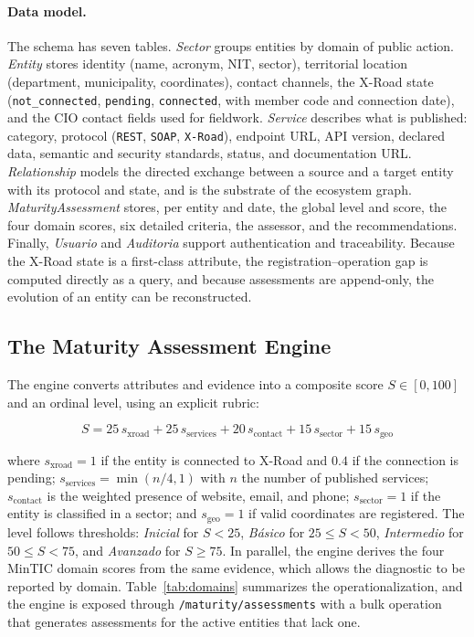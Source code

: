 \documentclass[runningheads]{llncs}
\begin{document}
\paragraph{Data model.} The schema has seven tables. \emph{Sector} groups
entities by domain of public action. \emph{Entity} stores identity (name,
acronym, NIT, sector), territorial location (department, municipality,
coordinates), contact channels, the X-Road state
(\texttt{not\_connected}, \texttt{pending}, \texttt{connected}, with member
code and connection date), and the CIO contact fields used for fieldwork.
\emph{Service} describes what is published: category, protocol
(\texttt{REST}, \texttt{SOAP}, \texttt{X-Road}), endpoint URL, API version,
declared data, semantic and security standards, status, and documentation
URL. \emph{Relationship} models the directed exchange between a source and a
target entity with its protocol and state, and is the substrate of the
ecosystem graph. \emph{MaturityAssessment} stores, per entity and date, the
global level and score, the four domain scores, six detailed criteria, the
assessor, and the recommendations. Finally, \emph{Usuario} and
\emph{Auditoria} support authentication and traceability. Because the X-Road
state is a first-class attribute, the registration--operation gap is computed
directly as a query, and because assessments are append-only, the evolution
of an entity can be reconstructed.

\subsection{The Maturity Assessment Engine}
\label{sec:arch:engine}

The engine converts attributes and evidence into a composite score
$S \in [0,100]$ and an ordinal level, using an explicit rubric:

\begin{equation}
S = 25\,s_{\text{xroad}} + 25\,s_{\text{services}} + 20\,s_{\text{contact}}
    + 15\,s_{\text{sector}} + 15\,s_{\text{geo}}
\label{eq:score}
\end{equation}

where $s_{\text{xroad}} = 1$ if the entity is connected to X-Road and $0.4$
if the connection is pending; $s_{\text{services}} = \min(n/4, 1)$ with $n$
the number of published services; $s_{\text{contact}}$ is the weighted
presence of website, email, and phone; $s_{\text{sector}} = 1$ if the entity
is classified in a sector; and $s_{\text{geo}} = 1$ if valid coordinates are
registered. The level follows thresholds: \emph{Inicial} for $S < 25$,
\emph{B\'asico} for $25 \le S < 50$, \emph{Intermedio} for $50 \le S < 75$,
and \emph{Avanzado} for $S \ge 75$. In parallel, the engine derives the four
MinTIC domain scores from the same evidence, which allows the diagnostic to
be reported by domain. Table~\ref{tab:domains} summarizes the
operationalization, and the engine is exposed through
\texttt{/maturity/assessments} with a bulk operation that generates
assessments for the active entities that lack one.
\end{document}
